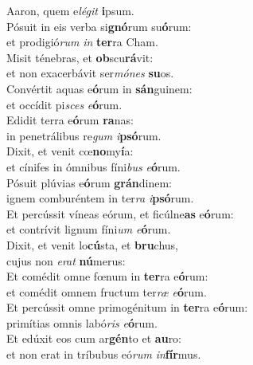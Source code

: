 \oddverse Aaron, quem e\textit{lé}\textit{git} \textbf{i}psum.\\
\evenverse Pósuit in eis verba si\textbf{gnó}rum su\textbf{ó}rum:~\*\\
\evenverse et prodigió\textit{rum} \textit{in} \textbf{ter}ra Cham.\\
\oddverse Misit ténebras, et \textbf{ob}scu\textbf{rá}vit:~\*\\
\oddverse et non exacerbávit ser\textit{mó}\textit{nes} \textbf{su}os.\\
\evenverse Convértit aquas e\textbf{ó}rum in \textbf{sán}guinem:~\*\\
\evenverse et occídit pi\textit{sces} \textit{e}\textbf{ó}rum.\\
\oddverse Edidit terra e\textbf{ó}rum \textbf{ra}nas:~\*\\
\oddverse in penetrálibus re\textit{gum} \textit{i}\textbf{psó}rum.\\
\evenverse Dixit, et venit cœ\textbf{no}my\textbf{í}a:~\*\\
\evenverse et cínifes in ómnibus fíni\textit{bus} \textit{e}\textbf{ó}rum.\\
\oddverse Pósuit plúvias e\textbf{ó}rum \textbf{grán}dinem:~\*\\
\oddverse ignem comburéntem in ter\textit{ra} \textit{i}\textbf{psó}rum.\\
\evenverse Et percússit víneas eórum, et ficúlne\textbf{as} e\textbf{ó}rum:~\*\\
\evenverse et contrívit lignum fíni\textit{um} \textit{e}\textbf{ó}rum.\\
\oddverse Dixit, et venit lo\textbf{cú}sta, et \textbf{bru}chus,~\*\\
\oddverse cujus non \textit{e}\textit{rat} \textbf{nú}merus:\\
\evenverse Et comédit omne fœnum in \textbf{ter}ra e\textbf{ó}rum:~\*\\
\evenverse et comédit omnem fructum ter\textit{ræ} \textit{e}\textbf{ó}rum.\\
\oddverse Et percússit omne primogénitum in \textbf{ter}ra e\textbf{ó}rum:~\*\\
\oddverse primítias omnis labó\textit{ris} \textit{e}\textbf{ó}rum.\\
\evenverse Et edúxit eos cum ar\textbf{gén}to et \textbf{au}ro:~\*\\
\evenverse et non erat in tríbubus eó\textit{rum} \textit{in}\textbf{fír}mus.\\
